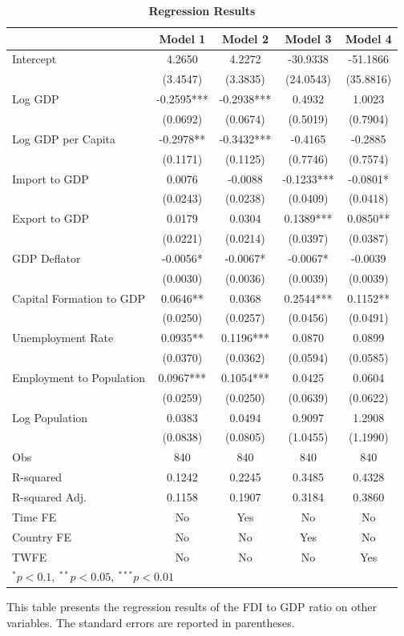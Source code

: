 \documentclass[12pt]{article}
\begin{document}
\begin{table}[!ht]
    \centering
    \footnotesize
    \caption{\textbf{Regression Results}}
    \label{app: reg}
    \begin{tabular}{lcccc}
        \toprule
         & Model 1 & Model 2 & Model 3 & Model 4 \\
        \midrule
        Intercept & 4.2650 & 4.2272 & -30.9338 & -51.1866 \\
         & (3.4547) & (3.3835) & (24.0543) & (35.8816) \\
        Log GDP & -0.2595*** & -0.2938*** & 0.4932 & 1.0023 \\
         & (0.0692) & (0.0674) & (0.5019) & (0.7904) \\
        Log GDP per Capita & -0.2978** & -0.3432*** & -0.4165 & -0.2885 \\
         & (0.1171) & (0.1125) & (0.7746) & (0.7574) \\
        Import to GDP & 0.0076 & -0.0088 & -0.1233*** & -0.0801* \\
         & (0.0243) & (0.0238) & (0.0409) & (0.0418) \\
        Export to GDP & 0.0179 & 0.0304 & 0.1389*** & 0.0850** \\
         & (0.0221) & (0.0214) & (0.0397) & (0.0387) \\
        GDP Deflator & -0.0056* & -0.0067* & -0.0067* & -0.0039 \\
         & (0.0030) & (0.0036) & (0.0039) & (0.0039) \\
        Capital Formation to GDP & 0.0646** & 0.0368 & 0.2544*** & 0.1152** \\
         & (0.0250) & (0.0257) & (0.0456) & (0.0491) \\
        Unemployment Rate & 0.0935** & 0.1196*** & 0.0870 & 0.0899 \\
         & (0.0370) & (0.0362) & (0.0594) & (0.0585) \\
        Employment to Population & 0.0967*** & 0.1054*** & 0.0425 & 0.0604 \\
         & (0.0259) & (0.0250) & (0.0639) & (0.0622) \\
        Log Population & 0.0383 & 0.0494 & 0.9097 & 1.2908 \\
         & (0.0838) & (0.0805) & (1.0455) & (1.1990) \\
        \midrule
        Obs & 840 & 840 & 840 & 840 \\
        R-squared & 0.1242 & 0.2245 & 0.3485 & 0.4328 \\
        R-squared Adj. & 0.1158 & 0.1907 & 0.3184 & 0.3860 \\
        Time FE & No & Yes & No & No \\
        Country FE & No & No & Yes & No \\
        TWFE & No & No & No & Yes \\
        \bottomrule
        \multicolumn{5}{l}{$^* p<0.1, \ ^{**} p<0.05, \ ^{***} p<0.01$} \\
    \end{tabular}

    \begin{tablenotes}
        \item This table presents the regression results of the FDI to GDP ratio on other variables. The standard errors are reported in parentheses.
    \end{tablenotes}
\end{table}
\end{document}
